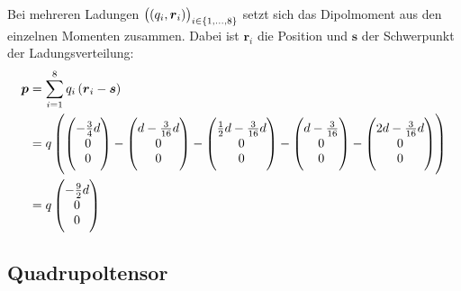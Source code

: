 \documentclass[11pt, ngerman, fleqn]{article}
\newcommand{\half}{\frac 12}
\renewcommand{\vec}[1]{\boldsymbol{#1}}
\begin{document}
Bei mehreren Ladungen $\del{\del{q_i, \vec r_i}}_{i \in \set{1, \ldots, 8}}$ setzt sich das Dipolmoment aus den einzelnen Momenten zusammen. Dabei ist $\vec r_i$ die Position und $\vec s$ der Schwerpunkt der Ladungsverteilung:
\begin{align*}
	\vec p &= \sum_{i=1}^8 q_i \del{\vec r_i - \vec s} \\
		   &= q \del{
		\begin{pmatrix}
			-\frac 3{4}d \\ 0 \\ 0
		\end{pmatrix}
		-
		\begin{pmatrix}
			d -\frac 3{16}d \\ 0 \\ 0
		\end{pmatrix}
		-
		\begin{pmatrix}
			\half d-\frac 3{16}d  \\ 0 \\ 0
		\end{pmatrix}
		-
		\begin{pmatrix}
			 d-\frac 3{16} \\ 0 \\ 0
		\end{pmatrix}
		-
		\begin{pmatrix}
			 2d-\frac 3{16}d \\ 0 \\ 0
		\end{pmatrix}
	} \\
	&=
	q \begin{pmatrix}
		- \frac 92 d \\ 0 \\ 0
	\end{pmatrix}
\end{align*}

\subsection{Quadrupoltensor}
\end{document}
